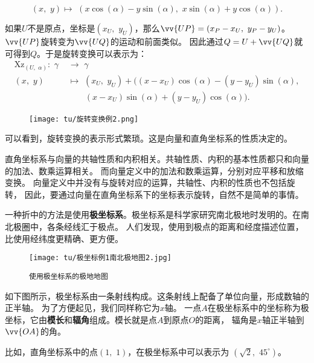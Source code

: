 \documentclass[12pt,UTF8]{ctexbook}
\theoremstyle{definition}
\theoremstyle{plain}
\begin{document}
$$ (x,\,\,y) \mapsto \,\, \left(x\cos{(\alpha)} - y\sin{(\alpha)}, \,\,x\sin{(\alpha)} + y\cos{(\alpha)}\right). $$

如果$U$不是原点，坐标是$(x_U, \,\,y_U)$，那么$\vv{UP} = (x_P - x_U, \,\, y_P - y_U)$。$\vv{UP}$旋转变为$\vv{UQ}$的运动和前面类似。
因此通过$Q = U + \vv{UQ}$就可得到$Q$。于是旋转变换可以表示为：
\begin{align*}
    \mathrm{Xz}_{(U,\,\,\alpha)} : \,\, \gamma\,\,&\rightarrow  \,\,\gamma  \\
    (x,\,\,y)  &\mapsto \,\, (x_U,\,\,y_U) +\big((x - x_U)\cos{(\alpha)} - (y - y_U)\sin{(\alpha)}, \\
    &\qquad (x - x_U)\sin{(\alpha)} + (y - y_U)\cos{(\alpha)}\big). 
\end{align*}

\begin{wrapfigure}[7]{r}{0.42\textwidth} %
    \vspace{-22pt}
    \flushright
    \texttt{[image: tu/旋转变换例2.png]}
\end{wrapfigure}

可以看到，旋转变换的表示形式繁琐。这是向量和直角坐标系的性质决定的。

直角坐标系与向量的共轴性质和内积相关。共轴性质、内积的基本性质都只和向量的加法、数乘运算相关。
而向量定义中的加法和数乘运算，分别对应平移和放缩变换。
向量定义中并没有与旋转对应的运算，共轴性、内积的性质也不包括旋转，
因此，要通过向量在直角坐标系下的坐标表示旋转，自然不是简单的事情。

一种折中的方法是使用\textbf{极坐标系}。极坐标系是科学家研究南北极地时发明的。在南北极圈中，各条经线汇于极点。
人们发现，使用到极点的距离和经度描述位置，比使用经纬度更精确、更方便。

\begin{figure}[h] %
    \centering
    \texttt{[image: tu/极坐标例1南北极地图2.jpg]}
    \caption*{\texttt{使用极坐标系的极地地图}}
\end{figure}

如下图所示，极坐标系由一条射线构成。这条射线上配备了单位向量，形成数轴的正半轴。
为了方便起见，我们同样称它为$x$轴。
一点$A$在极坐标系中的坐标称为\textnormal{极坐标}，它由\textbf{模长}和\textbf{辐角}组成。模长就是点$A$到原点$O$的距离，
辐角是$x$轴正半轴到$\vv{OA}$的角。

比如，直角坐标系中的点$(1,\,\,1)$，在极坐标系中可以表示为
$\left(\sqrt{2},\,\, 45^\circ\right)$。
\end{document}
